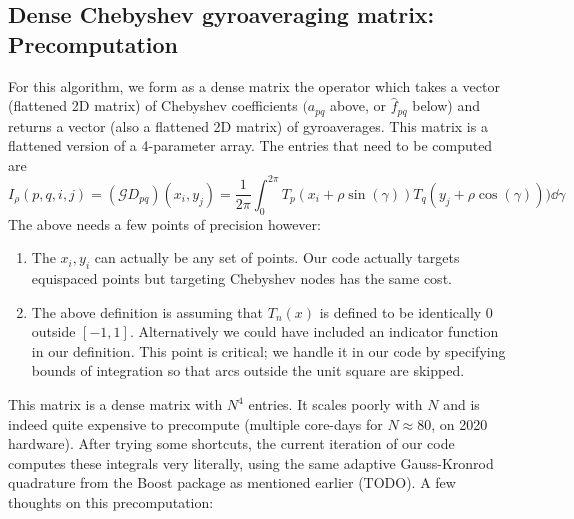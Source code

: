 \subsection{Dense Chebyshev gyroaveraging matrix:  Precomputation}
For this algorithm, we form as a dense matrix the operator which takes a vector (flattened 2D matrix) of Chebyshev coefficients $(a_{pq}$ above, or $\hat{f}_{pq}$ below) and returns a vector (also a flattened 2D matrix) of gyroaverages.  This matrix is a flattened version of a 4-parameter array.  The entries that need to be computed are
\[ I_{\rho}(p,q,i,j) =  (\mathcal{G}D_{pq})(x_i,y_j) =  
\frac{1}{2 \pi}\int_{0}^{2\pi} T_p(x_i+\rho \sin(\gamma))T_q (y_j + \rho \cos(\gamma))) \dd{\gamma}\]
The above needs a few points of precision however:
\begin{enumerate}
	\item The $x_i,y_i$ can actually be any set of points.  Our code actually targets equispaced points but targeting Chebyshev nodes has the same cost.
	\item The above definition is assuming that $T_n(x)$ is defined to be identically 0 outside $[-1,1]$.  Alternatively we could have included an indicator function in our definition.  This point is critical; we handle it in our code by specifying bounds of integration so that arcs outside the unit square are skipped.   
\end{enumerate}
This matrix is a dense matrix with $N^4$ entries. It scales poorly with $N$ and is indeed quite expensive to precompute (multiple core-days for $N \approx 80$, on 2020 hardware).  After trying some shortcuts, the current iteration of our code computes these integrals very literally, using the same adaptive Gauss-Kronrod quadrature from the Boost package as mentioned earlier (TODO).  A few thoughts on this precomputation:
